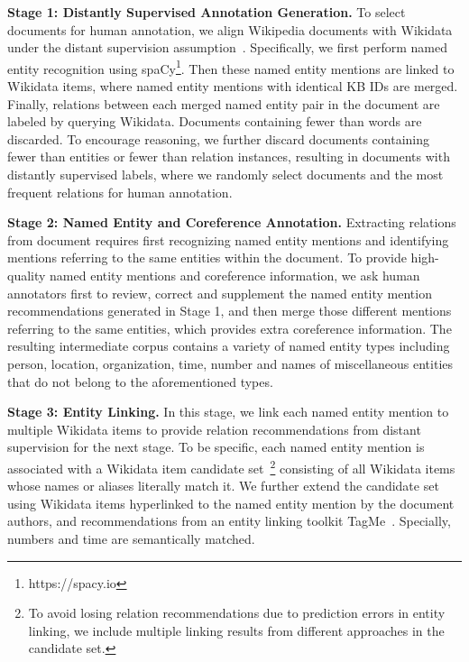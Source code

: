 \documentclass[11pt,a4paper]{article}
\begin{document}
\smallskip
\noindent
\textbf{Stage 1: Distantly Supervised Annotation Generation.}
\label{Sec: distant}
To select documents for human annotation, we align Wikipedia documents with Wikidata under the distant supervision assumption~\cite{mintz2009distant}. Specifically, we first perform named entity recognition using {spaCy}\footnote{https://spacy.io}. Then these named entity mentions are linked to Wikidata items, where named entity mentions with identical KB IDs are merged. Finally, relations between each merged named entity pair in the document are labeled by querying Wikidata. Documents containing fewer than  words are discarded. To encourage reasoning, we further discard documents containing fewer than  entities or fewer than  relation instances, resulting in  documents with distantly supervised labels, where we randomly select  documents and the most frequent  relations for human annotation. 
 
\smallskip
\noindent
\textbf{Stage 2: Named Entity and Coreference Annotation.} 
Extracting relations from document requires first recognizing named entity mentions and identifying mentions referring to the same entities within the document. To provide high-quality named entity mentions and coreference information, we ask human annotators first to review, correct and supplement the named entity mention recommendations generated in Stage 1, and then merge those different mentions referring to the same entities, which provides extra coreference information. The resulting intermediate corpus contains a variety of named entity types including person, location, organization, time, number and names of miscellaneous entities that do not belong to the aforementioned types. 


\smallskip
\noindent
\textbf{Stage 3: Entity Linking.}
 In this stage, we link each named entity mention to multiple Wikidata items to provide relation recommendations from distant supervision for the next stage. To be specific, each named entity mention is associated with a Wikidata item candidate set~\footnote{To avoid losing relation recommendations due to prediction errors in entity linking, we include multiple linking results from different approaches in the candidate set.} consisting of all Wikidata items whose names or aliases literally match it. We further extend the candidate set using Wikidata items hyperlinked to the named entity mention by the document authors, and recommendations from an entity linking toolkit TagMe~\cite{Tagme}.  Specially, numbers and time are semantically matched.
\end{document}
